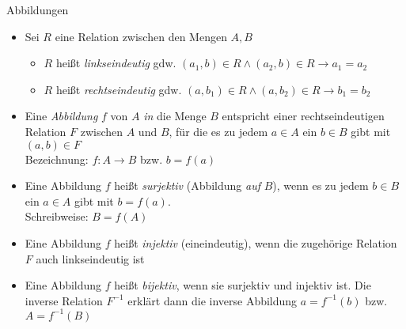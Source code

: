 \begin{frame}{Abbildungen}
	\begin{itemize}
		\item Sei $R$ eine Relation zwischen den Mengen $A,B$
		\begin{itemize}
			\item $R$ heißt \emph{linkseindeutig} gdw. $(a_1,b)\in R\land (a_2,b)\in R \rightarrow a_1=a_2$
			\item $R$ heißt \emph{rechtseindeutig} gdw. $(a,b_1)\in R\land (a,b_2)\in R \rightarrow b_1=b_2$
		\end{itemize}
		\item Eine \emph{Abbildung} $f$ von $A$ \emph{in} die Menge $B$ entspricht einer rechtseindeutigen Relation $F$ zwischen $A$ und $B$, für die es zu jedem $a\in A$ ein $b\in B$ gibt mit $(a,b) \in F$\\
		Bezeichnung: $f: A \rightarrow B$ bzw. $b=f(a)$
		\item Eine Abbildung $f$ heißt \emph{surjektiv} (Abbildung \emph{auf} $B$), wenn es zu jedem $b\in B$ ein $a\in A$ gibt mit $b=f(a)$.\\
		Schreibweise: $B = f(A)$
		\item Eine Abbildung $f$ heißt \emph{injektiv} (eineindeutig), wenn die zugehörige Relation $F$ auch linkseindeutig ist
		\item Eine Abbildung $f$ heißt \emph{bijektiv}, wenn sie surjektiv und injektiv ist. Die inverse Relation $F^{-1}$ erklärt dann die inverse Abbildung $a = f^{-1}(b)$ bzw. $A=f^{-1}(B)$
	\end{itemize}
\end{frame}

